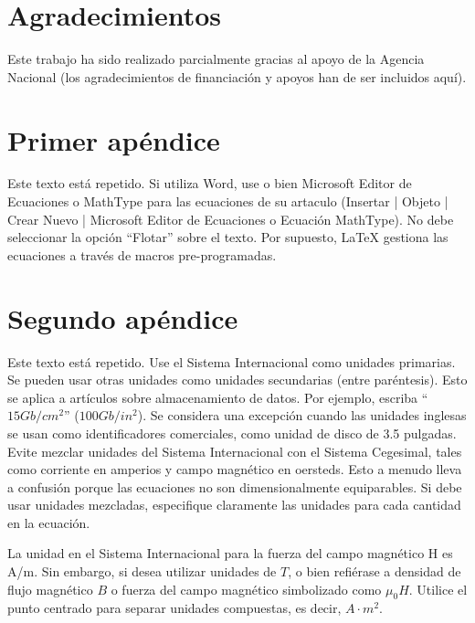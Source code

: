 \documentclass[5p,times,authoryear]{elsarticle}
\begin{document}
\section*{Agradecimientos}

Este trabajo ha sido realizado parcialmente gracias al apoyo de la Agencia Nacional (los agradecimientos de financiación y apoyos han de ser incluidos aquí).








\appendix
\section{Primer apéndice}    
Este texto está repetido. Si utiliza Word, use o bien Microsoft Editor de Ecuaciones o MathType  para las ecuaciones de su artaculo (Insertar | Objeto | Crear Nuevo | Microsoft Editor de Ecuaciones o Ecuación MathType).
No debe seleccionar la opción ``Flotar'' sobre el texto. Por supuesto, LaTeX gestiona las ecuaciones a través de macros pre-programadas.

\section{Segundo apéndice}

Este texto está repetido. Use el Sistema Internacional como unidades primarias. Se pueden usar otras unidades como unidades secundarias (entre paréntesis). Esto se aplica a artículos sobre almacenamiento de datos. Por ejemplo, escriba ``$15 Gb/cm^2$'' ($100 Gb/in^2$). Se considera una excepción cuando las unidades inglesas se usan como identificadores comerciales, como unidad de disco de 3.5 pulgadas. Evite mezclar unidades del Sistema Internacional con el Sistema Cegesimal, tales como corriente en amperios y campo magnético en  oersteds. Esto a menudo lleva a confusión porque las ecuaciones no son dimensionalmente equiparables. Si debe usar unidades mezcladas, especifique claramente las unidades para cada cantidad  en la ecuación.

La unidad en el Sistema Internacional para la fuerza del campo magnético H es A/m. Sin embargo, si desea utilizar unidades de $T$, o bien refiérase a densidad de flujo magnético $B$ o fuerza del campo magnético simbolizado como $\mu_0 H$. Utilice el punto centrado para separar unidades compuestas,  es decir, $A\cdot m^2$.
\end{document}
